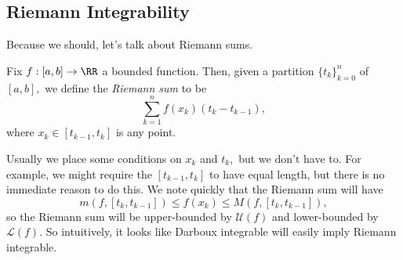 \documentclass[../notes.tex]{subfiles}
\begin{document}
\subsection{Riemann Integrability}
Because we should, let's talk about Riemann sums.
\begin{definition}
	Fix $f:[a,b]\to\RR$ a bounded function. Then, given a partition $\{t_k\}_{k=0}^n$ of $[a,b],$ we define the \textit{Riemann sum} to be
	\[\sum_{k=1}^nf(x_k)(t_k-t_{k-1}),\]
	where $x_k\in[t_{k-1},t_k]$ is any point.
\end{definition}
Usually we place some conditions on $x_k$ and $t_k,$ but we don't have to. For example, we might require the $[t_{k-1},t_k]$ to have equal length, but there is no immediate reason to do this. We note quickly that the Riemann sum will have
\[m(f,[t_k,t_{k-1}])\le f(x_k)\le M(f,[t_k,t_{k-1}]),\]
so the Riemann sum will be upper-bounded by $\mathcal U(f)$ and lower-bounded by $\mathcal L(f).$ So intuitively, it looks like Darboux integrable will easily imply Riemann integrable.
\end{document}
